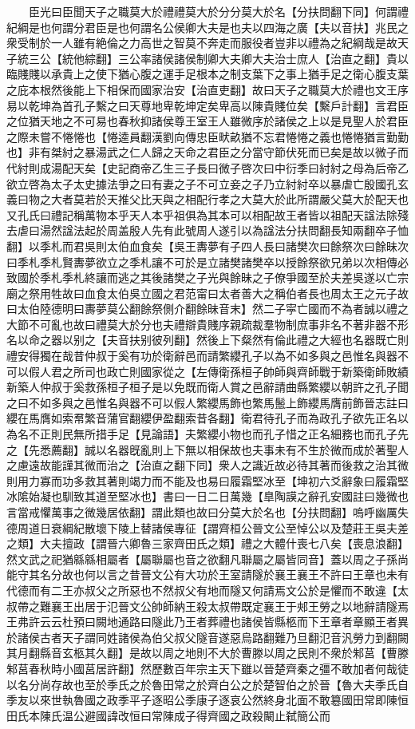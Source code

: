 　　臣光曰臣聞天子之職莫大於禮禮莫大於分分莫大於名【分扶問翻下同】何謂禮紀綱是也何謂分君臣是也何謂名公侯卿大夫是也夫以四海之廣【夫以音扶】兆民之衆受制於一人雖有絶倫之力高世之智莫不奔走而服役者豈非以禮為之紀綱哉是故天子統三公【統他綜翻】三公率諸侯諸侯制卿大夫卿大夫治士庶人【治直之翻】貴以臨賤賤以承貴上之使下猶心腹之運手足根本之制支葉下之事上猶手足之衛心腹支葉之庇本根然後能上下相保而國家治安【治直吏翻】故曰天子之職莫大於禮也文王序易以乾坤為首孔子繫之曰天尊地卑乾坤定矣卑高以陳貴賤位矣【繫戶計翻】言君臣之位猶天地之不可易也春秋抑諸侯尊王室王人雖微序於諸侯之上以是見聖人於君臣之際未嘗不惓惓也【惓逵員翻漢劉向傳忠臣畎畝猶不忘君惓惓之義也惓惓猶言勤勤也】非有桀紂之暴湯武之仁人歸之天命之君臣之分當守節伏死而已矣是故以微子而代紂則成湯配天矣【史記商帝乙生三子長曰微子啓次曰中衍季曰紂紂之母為后帝乙欲立啓為太子太史據法爭之曰有妻之子不可立妾之子乃立紂紂卒以暴虐亡殷國孔玄義曰物之大者莫若於天推父比天與之相配行孝之大莫大於此所謂嚴父莫大於配天也又孔氏曰禮記稱萬物本乎天人本乎祖俱為其本可以相配故王者皆以祖配天諡法除殘去虐曰湯然諡法起於周盖殷人先有此號周人遂引以為諡法分扶問翻長知兩翻卒子恤翻】以季札而君吳則太伯血食矣【吳王夀夢有子四人長曰諸樊次曰餘祭次曰餘昧次曰季札季札賢夀夢欲立之季札讓不可於是立諸樊諸樊卒以授餘祭欲兄弟以次相傳必致國於季札季札終讓而逃之其後諸樊之子光與餘昧之子僚爭國至於夫差吳遂以亡宗廟之祭用牲故曰血食太伯吳立國之君范甯曰太者善大之稱伯者長也周太王之元子故曰太伯陸德明曰夀夢莫公翻餘祭側介翻餘昧音末】然二子寜亡國而不為者誠以禮之大節不可亂也故曰禮莫大於分也夫禮辯貴賤序親疏裁羣物制庶事非名不著非器不形名以命之器以别之【夫音扶别彼列翻】然後上下粲然有倫此禮之大經也名器既亡則禮安得獨在哉昔仲叔于奚有功於衛辭邑而請繁纓孔子以為不如多與之邑惟名與器不可以假人君之所司也政亡則國家從之【左傳衛孫桓子帥師與齊師戰于新築衛師敗績新築人仲叔于奚救孫桓子桓子是以免既而衛人賞之邑辭請曲縣繁纓以朝許之孔子聞之曰不如多與之邑惟名與器不可以假人繁纓馬飾也繁馬鬛上飾纓馬膺前飾晉志註曰纓在馬膺如索帬繁音蒲官翻纓伊盈翻索昔各翻】衛君待孔子而為政孔子欲先正名以為名不正則民無所措手足【見論語】夫繁纓小物也而孔子惜之正名細務也而孔子先之【先悉薦翻】誠以名器旣亂則上下無以相保故也夫事未有不生於微而成於著聖人之慮遠故能謹其微而治之【治直之翻下同】衆人之識近故必待其著而後救之治其微則用力寡而功多救其著則竭力而不能及也易曰履霜堅冰至【坤初六爻辭象曰履霜堅冰隂始凝也馴致其道至堅冰也】書曰一日二日萬幾【臯陶謨之辭孔安國註曰幾微也言當戒懼萬事之微幾居依翻】謂此類也故曰分莫大於名也【分扶問翻】嗚呼幽厲失德周道日衰綱紀散壞下陵上替諸侯專征【謂齊桓公晉文公至悼公以及楚莊王吳夫差之類】大夫擅政【謂晉六卿魯三家齊田氏之類】禮之大體什喪七八矣【喪息浪翻】然文武之祀猶緜緜相屬者【屬聯屬也音之欲翻凡聯屬之屬皆同音】蓋以周之子孫尚能守其名分故也何以言之昔晉文公有大功於王室請隧於襄王襄王不許曰王章也未有代德而有二王亦叔父之所惡也不然叔父有地而隧又何請焉文公於是懼而不敢違【太叔帶之難襄王出居于氾晉文公帥師納王殺太叔帶既定襄王于郟王勞之以地辭請隧焉王弗許云云杜預曰闕地通路曰隧此乃王者葬禮也諸侯皆縣柩而下王章者章顯王者異於諸侯古者天子謂同姓諸侯為伯父叔父隧音遂惡烏路翻難乃旦翻氾音汎勞力到翻闕其月翻縣音玄柩其久翻】是故以周之地則不大於曹滕以周之民則不衆於邾莒【曹滕邾莒春秋時小國莒居許翻】然歷數百年宗主天下雖以晉楚齊秦之彊不敢加者何哉徒以名分尚存故也至於季氏之於魯田常之於齊白公之於楚智伯之於晉【魯大夫季氏自季友以來世執魯國之政季平子逐昭公季康子逐哀公然終身北面不敢簒國田常即陳恒田氏本陳氏温公避國諱改恒曰常陳成子得齊國之政殺闞止弑簡公而